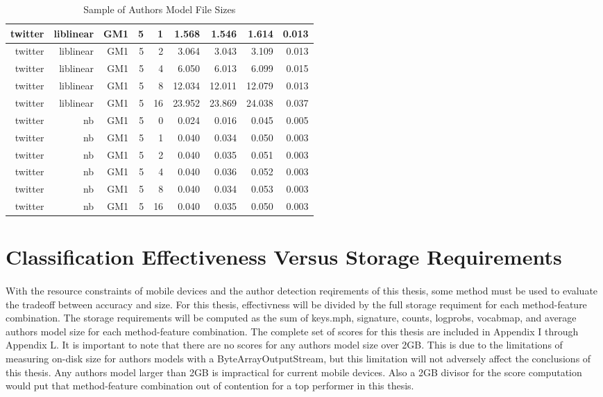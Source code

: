\begin{table}[htbp!]
\begin{center}
\begin{tabular}{ | r | r | r | r | r | r | r | r | r | }
twitter & liblinear & GM1 & 5 & 1 & 1.568 & 1.546 & 1.614 & 0.013\\ \hline 
twitter & liblinear & GM1 & 5 & 2 & 3.064 & 3.043 & 3.109 & 0.013\\ \hline 
twitter & liblinear & GM1 & 5 & 4 & 6.050 & 6.013 & 6.099 & 0.015\\ \hline 
twitter & liblinear & GM1 & 5 & 8 & 12.034 & 12.011 & 12.079 & 0.013\\ \hline 
twitter & liblinear & GM1 & 5 & 16 & 23.952 & 23.869 & 24.038 & 0.037\\ \hline 
twitter & nb & GM1 & 5 & 0 & 0.024 & 0.016 & 0.045 & 0.005\\ \hline 
twitter & nb & GM1 & 5 & 1 & 0.040 & 0.034 & 0.050 & 0.003\\ \hline 
twitter & nb & GM1 & 5 & 2 & 0.040 & 0.035 & 0.051 & 0.003\\ \hline 
twitter & nb & GM1 & 5 & 4 & 0.040 & 0.036 & 0.052 & 0.003\\ \hline 
twitter & nb & GM1 & 5 & 8 & 0.040 & 0.034 & 0.053 & 0.003\\ \hline 
twitter & nb & GM1 & 5 & 16 & 0.040 & 0.035 & 0.050 & 0.003\\ \hline 
\end{tabular}
		\caption{Sample of Authors Model File Sizes}
		\label{tab:sample_authors_model_sizes}
		\end{center}
	\end{table}

\section{Classification Effectiveness Versus Storage Requirements}
\paragraph*{} With the resource constraints of mobile devices and the author detection reqirements of this thesis, some method must be used to evaluate the tradeoff between accuracy and size.  For this thesis, effectivness will be divided by the full storage requiment for each method-feature combination.  The storage requirements will be computed as the sum of keys.mph, signature, counts, logprobs, vocabmap, and average authors model size for each method-feature combination.  The complete set of scores for this thesis are included in Appendix I through Appendix L.  It is important to note that there are no scores for any authors model size over 2GB.  This is due to the limitations of measuring on-disk size for authors models with a ByteArrayOutputStream, but this limitation will not adversely affect the conclusions of this thesis.  Any authors model larger than 2GB is impractical for current mobile devices.  Also a 2GB divisor for the score computation would put that method-feature combination out of contention for a top performer in this thesis.

